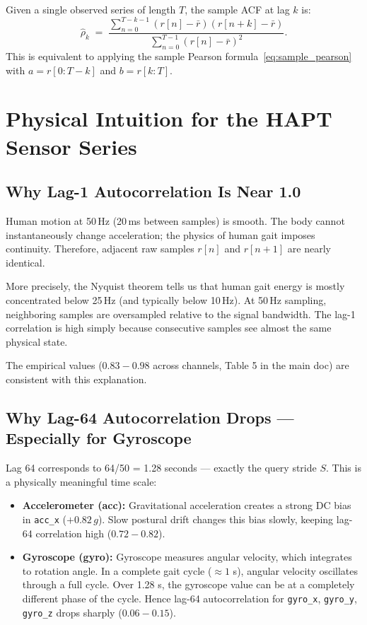 \documentclass[11pt, a4paper]{article}
\theoremstyle{definition}
\theoremstyle{plain}
\newcommand{\code}[1]{\texttt{#1}}
\begin{document}
Given a single observed series of length $T$, the sample ACF at lag $k$ is:
\begin{equation}
  \hat{\rho}_k \;=\;
  \frac{\sum_{n=0}^{T-k-1} (r[n] - \bar{r})(r[n+k] - \bar{r})}
       {\sum_{n=0}^{T-1} (r[n] - \bar{r})^2}.
\end{equation}
This is equivalent to applying the sample Pearson formula~\eqref{eq:sample_pearson}
with $a = r[0:T-k]$ and $b = r[k:T]$.

\section{Physical Intuition for the HAPT Sensor Series}

\subsection{Why Lag-1 Autocorrelation Is Near 1.0}

Human motion at 50\,Hz (20\,ms between samples) is smooth. The body cannot
instantaneously change acceleration; the physics of human gait imposes continuity.
Therefore, adjacent raw samples $r[n]$ and $r[n+1]$ are nearly identical.

More precisely, the Nyquist theorem tells us that human gait energy is mostly
concentrated below 25\,Hz (and typically below 10\,Hz). At 50\,Hz sampling,
neighboring samples are oversampled relative to the signal bandwidth. The lag-1
correlation is high simply because consecutive samples see almost the same
physical state.

The empirical values ($0.83 - 0.98$ across channels, Table 5 in the main doc)
are consistent with this explanation.

\subsection{Why Lag-64 Autocorrelation Drops — Especially for Gyroscope}

Lag 64 corresponds to 64/50 = 1.28 seconds — exactly the query stride $S$.
This is a physically meaningful time scale:

\begin{itemize}[leftmargin=1.5em]
  \item \textbf{Accelerometer (acc):} Gravitational acceleration creates a strong
        DC bias in \code{acc\_x} ($+0.82\,g$). Slow postural drift changes this
        bias slowly, keeping lag-64 correlation high ($0.72 - 0.82$).
  \item \textbf{Gyroscope (gyro):} Gyroscope measures angular velocity, which
        integrates to rotation angle. In a complete gait cycle ($\approx 1$ s),
        angular velocity oscillates through a full cycle. Over 1.28 s, the
        gyroscope value can be at a completely different phase of the cycle.
        Hence lag-64 autocorrelation for \code{gyro\_x}, \code{gyro\_y},
        \code{gyro\_z} drops sharply ($0.06 - 0.15$).
\end{itemize}
\end{document}
